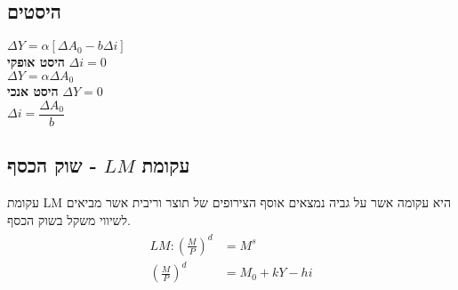 \documentclass[a4paper,11pt]{article}
\newcommand{\D}[1]{\Delta #1}
\renewcommand{\a}{\alpha}
\begin{document}
\begin{RTL}
\subsection{היסטים}
$\Delta Y = \alpha \left[\Delta A_0 - b\Delta i\right]$  \vspace{10pt}
\\
\textbf{היסט אופקי } $\Delta i = 0 $ \vspace{10pt} 
\\
$\D{Y} = \a \D{A_0}$ \vspace{10pt}
\\ 
\textbf{היסט אנכי } $\D{Y} = 0 $ \vspace{10pt}
\\
$\D{i} = \dfrac{\D{A_0}}{b}$
\end{RTL}
\newpage

\begin{RTL}    
\subsection{עקומת $LM$ - שוק הכסף}
עקומת LM היא עקומה אשר על גביה נמצאים אוסף הצירופים של תוצר וריבית אשר מביאים לשיווי משקל
בשוק הכסף. 
\begin{align*}
    \begin{split}
       LM : \left(\frac{M}{P}\right) ^ d  & = M ^ s \\ 
       \left(\frac{M}{P}  \right) ^ d    & = M_0 + kY - hi 
    \end{split}
\end{align*}

\end{RTL}
\end{document}
